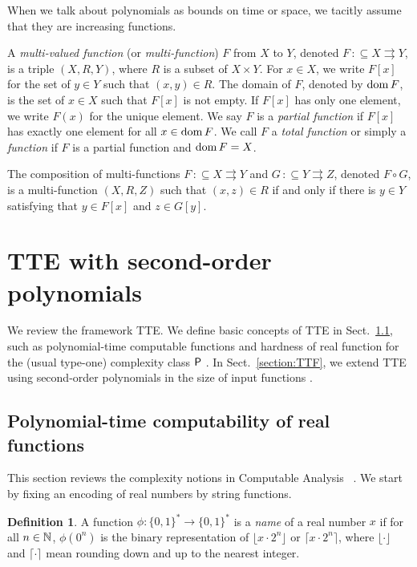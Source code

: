 \documentclass{article}
\theoremstyle{definition}
\newtheorem{definition}[theorem]{Definition}
\theoremstyle{remark}
\newcommand{\pcolon}{\mathpunct{\,:\subseteq}}
\begin{document}
When we talk about polynomials as bounds on time or space, 
we tacitly assume that they are increasing functions. 

A {\em multi-valued function} (or {\em multi-function}) $F$ from $X$ to $Y$,
denoted $F \pcolon X \rightrightarrows Y$,
is a triple $(X, R, Y)$, where $R$ is a subset of $X \times Y$.
For $x \in X$, we write $F[x]$ for the set of $y \in Y$ such that $(x,y) \in R$.
The domain of $F$, denoted by $\mathop{\rm dom} F$, is the set of $x \in X$ such that 
$F[x]$ is not empty.
If $F[x]$ has only one element, we write $F(x)$ for the unique element.
We say $F$ is a {\em partial function} if $F[x]$ has exactly one element for all
$x \in \mathop{\rm dom} F$.
We call $F$ a {\em total function} or simply a {\em function} 
if $F$ is a partial function and $\mathop{\rm dom} F = X$.

The composition of multi-functions $F \pcolon X \rightrightarrows Y$ and 
$G \pcolon Y \rightrightarrows Z$, denoted $F \circ G$, is a multi-function
$(X, R, Z)$ such that $(x, z) \in R$ if and only if there is $y \in Y$ 
satisfying that $y \in F[x]$ and $z \in G[y]$.

\section{TTE with second-order polynomials}
\label{section: computable analysis}

We review the framework TTE. 
We define basic concepts of TTE in Sect.~\ref{section:TTE},
such as polynomial-time computable functions and hardness of real function
for the (usual type-one) complexity class $\mathsf{P}$ \cite{ko1991complexity}.
In Sect.~\ref{section:TTF}, we extend TTE using second-order polynomials
in the size of input functions \cite{kawamura2012complexity}.

\subsection{Polynomial-time computability of real functions}
\label{section:TTE}

This section reviews the complexity notions 
in Computable Analysis~%
\cite{ko1991complexity,weihrauch00:_comput_analy}. 
We start by fixing an encoding of real numbers 
by string functions.

\begin{definition}
 A function $\phi \colon \{0, 1\} ^* \to \{0, 1\} ^*$ is a \emph{name} of a real number $x$ 
 if for all $n \in \mathbb N$,
  $\phi(0^n)$ is the binary representation of $\lfloor x \cdot 2^n \rfloor$ or
  $\lceil x \cdot 2^n \rceil$,
 where $\lfloor \cdot \rfloor$ and $\lceil \cdot \rceil$ mean
 rounding down and up to the nearest integer.
\end{definition}
\end{document}
